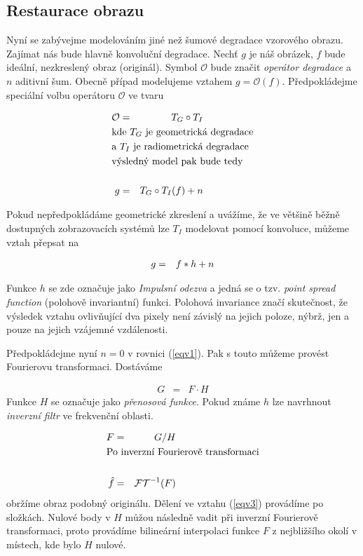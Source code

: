 \subsection{Restaurace obrazu}
Nyní se zabývejme modelováním jiné než šumové degradace vzorového obrazu. Zajímat nás bude hlavně konvoluční degradace.
Nechť $g$ je náš obrázek, $f$ bude ideální, nezkreslený obraz (originál). Symbol $\mathcal{O}$ bude značit 
{\em operátor degradace} a $n$ aditivní šum. Obecně případ modelujeme vztahem $g=\mathcal{O} (f)$. Předpokládejme
speciální volbu operátoru $\mathcal{O}$ ve tvaru

\begin{eqnarray}
\mathcal{O}&=&T_G\circ T_I\\
\noalign{\hbox{kde $T_G$ je geometrická degradace}\nonumber}
\noalign{\hbox{a $T_I$ je radiometrická degradace}\nonumber}
\noalign{\hbox{výsledný model pak bude tedy}\nonumber}\\
g&=&T_G\circ T_I (f) +n
\end{eqnarray}

Pokud nepředpokládáme geometrické zkreslení a uvážíme, že ve většině běžně dostupných zobrazovacích systémů lze $T_I$ 
modelovat pomocí konvoluce, můžeme vztah přepsat na

\begin{eqnarray}
g&=&f\ast h +n \label{eqv1}
\end{eqnarray}

Funkce $h$ se zde označuje jako  {\em Impulsní odezva} a jedná se o tzv. {\em point spread function} (polohově invariantní)
funkci. Polohová invariance značí skutečnost, že výsledek vztahu ovlivňující dva pixely není závislý na jejich poloze, 
nýbrž, jen a pouze na jejich vzájemné vzdálenosti.

Předpokládejme nyní $n=0$ v rovnici (\ref{eqv1}). Pak s touto můžeme provést Fourierovu transformaci. Dostáváme

\begin{eqnarray}
G&=&F\cdot H\label{eqv2}
\end{eqnarray}
Funkce $H$ se označuje jako {\em přenosová funkce}. Pokud známe $h$ lze navrhnout {\em inverzní filtr} 
ve frekvenční oblasti.

\begin{eqnarray}
F&=&G/H\label{eqv3}\\
\noalign{\hbox{Po inverzní Fourierově transformaci}\nonumber}\\
\hat{f}&=&\mathcal{FT}^{-1}(F)
\end{eqnarray}
obržíme obraz podobný originálu. Dělení ve vztahu (\ref{eqv3}) provádíme po složkách. Nulové body v $H$ můžou 
následně vadit při inverzní Fourierově transformaci, proto provádíme bilineární interpolaci funkce $F$ 
z nejbližšího okolí v místech, kde bylo $H$ nulové.


